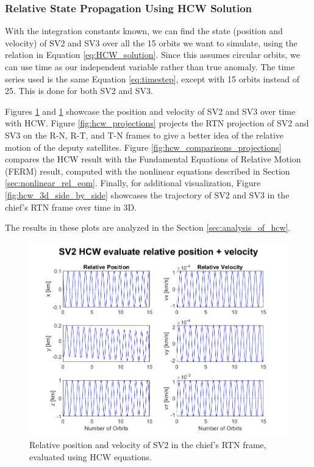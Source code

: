 \subsubsection{Relative State Propagation Using HCW Solution}

With the integration constants known, we can find the state (position and velocity) of SV2 and SV3 over all the 15 orbits we want to simulate, using the relation in Equation \ref{eq:HCW_solution}. Since this assumes circular orbits, we can use time as our independent variable rather than true anomaly. The time series used is the same Equation \ref{eq:timestep}, except with 15 orbits instead of 25. This is done for both SV2 and SV3.

Figures \ref{fig:hcw_sv2_pos_vel} and \ref{fig:hcw_sv2_pos_vel} showcase the position and velocity of SV2 and SV3 over time with HCW. Figure \ref{fig:hcw_projections} projects the RTN projection of SV2 and SV3 on the R-N, R-T, and T-N frames to give a better idea of the relative motion of the deputy satellites. Figure \ref{fig:hcw_comparisons_projections} compares the HCW result with the Fundamental Equations of Relative Motion (FERM) result, computed with the nonlinear equations described in Section \ref{sec:nonlinear_rel_eom}. Finally, for additional visualization, Figure \ref{fig:hcw_3d_side_by_side} showcases the trajectory of SV2 and SV3 in the chief's RTN frame over time in 3D.

The results in these plots are analyzed in the Section \ref{sec:analysis_of_hcw}.

\begin{figure}[htpb]
    \centering
    \includegraphics[width=0.7\linewidth]{sim/figures/PS3/HCW_pos_vel_SV2.png}
    \caption{Relative position and velocity of SV2 in the chief's RTN frame, evaluated using HCW equations.}
    \label{fig:hcw_sv2_pos_vel}
\end{figure}


